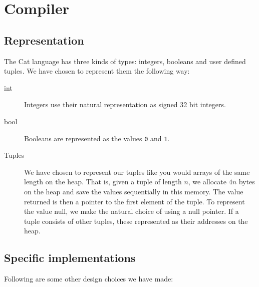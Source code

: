 \chapter{Compiler}

\section{Representation}
The Cat language has three kinds of types: integers, booleans and user defined
tuples. We have chosen to represent them the following way:

\begin{description}
    \item[int] {
        Integers use their natural representation as signed 32 bit integers.
    }
    \item[bool] {
        Booleans are represented as the values \texttt{0} and \texttt{1}.
    }
    \item[Tuples] {
        We have chosen to represent our tuples like you would arrays of the
        same length on the heap. That is, given a tuple of length $n$, we
        allocate $4n$ bytes on the heap and save the values sequentially in
        this memory. The value returned is then a pointer to the first element
        of the tuple. To represent the value null, we make the natural choice
        of using a null pointer. If a tuple consists of other tuples, these
        represented as their addresses on the heap.
    }
\end{description}


\section{Specific implementations}
Following are some other design choices we have made:

